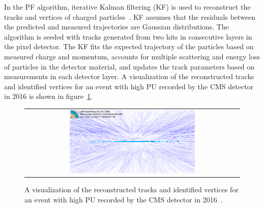In the PF algorithm, iterative Kalman filtering (KF) is used to reconstruct the tracks and vertices of charged particles~\cite{Sirunyan:2270046}.
KF assumes that the residuals between the predicted and measured trajectories are Gaussian distributions.
The algorithm is seeded with tracks generated from two hits in consecutive layers in the pixel detector.
The KF fits the expected trajectory of the particles based on measured charge and momentum, accounts for multiple scattering and energy loss of particles in the detector material, and updates the track parameters based on measurements in each detector layer.
A visualization of the reconstructed tracks and identified vertices for an event with high PU recorded by the CMS detector in 2016 is shown in figure~\ref{Pileup}.
\begin{figure}[htb]
  \begin{center}
    \begin{tabular}{c}
        \includegraphics[width=0.6\textwidth]{fig_Event_Reconstruction/Pileup.png}
    \end{tabular}
    \caption{A visualization of the reconstructed tracks and identified vertices for an event with high PU recorded by the CMS detector in 2016~\cite{Collaboration:2231915}.
            }
    \label{Pileup}
  \end{center}
\end{figure}

